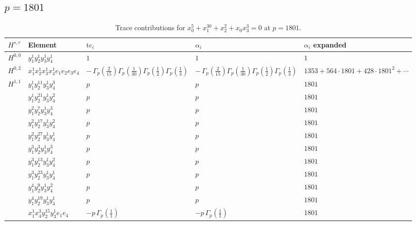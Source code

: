 \documentclass[11pt]{article}
\begin{document}
\subsection*{$p = 1801$}

\begin{table}[ht]
\centering
\caption{Trace contributions for $x_0^{5} + x_1^{30} + x_2^{2} + x_0 x_3^{3} = 0$ at $p=1801$.}\label{tab:deformed-71}
\renewcommand{\arraystretch}{1.1}
{\scriptsize
\begin{tabular}{@{}lllll@{}}
\toprule
$H^{s,r}$ & Element & $\mathrm{tc}_i$ & $\alpha_i$ & $\alpha_i$ expanded \\
\midrule
$H^{0,0}$ & $y_{1}^{1} y_{2}^{1} y_{3}^{1} y_{4}^{1}$ & $1$ & $1$ & $1$ \\
\midrule
$H^{0,2}$ & $x_{1}^{1} x_{2}^{1} x_{3}^{1} x_{4}^{1}  e_{1} e_{2} e_{3} e_{4}$ & $- \, \Gamma_p \left( \frac{2}{15} \right) \Gamma_p \left( \frac{1}{30} \right) \Gamma_p \left( \frac{1}{2} \right) \Gamma_p \left( \frac{1}{3} \right)$ & $- \, \Gamma_p \left( \frac{2}{15} \right) \Gamma_p \left( \frac{1}{30} \right) \Gamma_p \left( \frac{1}{2} \right) \Gamma_p \left( \frac{1}{3} \right)$ & $1353{+}564{\cdot}1801{+}428{\cdot}1801^{2}{+}\cdots$ \\
\midrule
$H^{1,1}$ & $y_{1}^{1} y_{2}^{11} y_{3}^{1} y_{4}^{3}$ & $p \,$ & $p \,$ & $1801$ \\
 & $y_{1}^{1} y_{2}^{21} y_{3}^{1} y_{4}^{2}$ & $p \,$ & $p \,$ & $1801$ \\
 & $y_{1}^{2} y_{2}^{7} y_{3}^{1} y_{4}^{3}$ & $p \,$ & $p \,$ & $1801$ \\
 & $y_{1}^{2} y_{2}^{17} y_{3}^{1} y_{4}^{2}$ & $p \,$ & $p \,$ & $1801$ \\
 & $y_{1}^{2} y_{2}^{27} y_{3}^{1} y_{4}^{1}$ & $p \,$ & $p \,$ & $1801$ \\
 & $y_{1}^{3} y_{2}^{3} y_{3}^{1} y_{4}^{3}$ & $p \,$ & $p \,$ & $1801$ \\
 & $y_{1}^{3} y_{2}^{13} y_{3}^{1} y_{4}^{2}$ & $p \,$ & $p \,$ & $1801$ \\
 & $y_{1}^{3} y_{2}^{23} y_{3}^{1} y_{4}^{1}$ & $p \,$ & $p \,$ & $1801$ \\
 & $y_{1}^{4} y_{2}^{9} y_{3}^{1} y_{4}^{2}$ & $p \,$ & $p \,$ & $1801$ \\
 & $y_{1}^{4} y_{2}^{19} y_{3}^{1} y_{4}^{1}$ & $p \,$ & $p \,$ & $1801$ \\
 & $x_{1}^{1} x_{4}^{3} y_{2}^{15} y_{3}^{1} e_{1} e_{4}$ & $- p \, \Gamma_p \left( \frac{1}{1} \right)$ & $- p \, \Gamma_p \left( \frac{1}{1} \right)$ & $1801$ \\

\end{tabular}}
\end{table}
\end{document}
